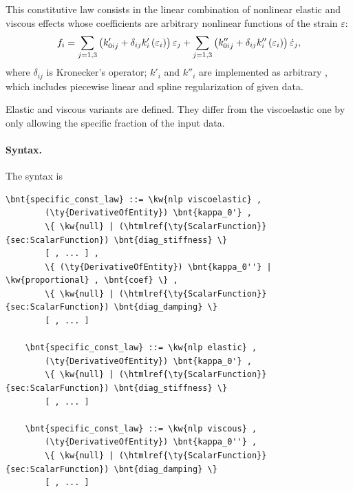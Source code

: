 This constitutive law consists in the linear combination
of nonlinear elastic and viscous effects whose coefficients
are arbitrary nonlinear functions of the strain $\varepsilon$:
\begin{equation}
	f_i = \sum_{j=1,3} \left( 
		k'_{0ij} + \delta_{ij} k_i'\left( \varepsilon_i \right)
	 \right) \varepsilon_j
	+ \sum_{j=1,3} \left( 
		k''_{0ij} + \delta_{ij} k''_i\left( \varepsilon_i \right)
	 \right) \dot{\varepsilon}_j ,
	\label{eq:nlp-cl}
\end{equation}
where $\delta_{ij}$ is Kronecker's operator;
$k'_i$ and $k''_i$ are implemented as arbitrary
,
which includes piecewise linear and spline regularization
of given data.

Elastic and viscous variants are defined.
They differ from the viscoelastic one by only allowing
the specific fraction of the input data.

\paragraph{Syntax.}
The syntax is
\begin{Verbatim}[commandchars=\\\{\}]
    \bnt{specific_const_law} ::= \kw{nlp viscoelastic} ,
        (\ty{DerivativeOfEntity}) \bnt{kappa_0'} ,
        \{ \kw{null} | (\htmlref{\ty{ScalarFunction}}{sec:ScalarFunction}) \bnt{diag_stiffness} \}
        [ , ... ] ,
        \{ (\ty{DerivativeOfEntity}) \bnt{kappa_0''} | \kw{proportional} , \bnt{coef} \} ,
        \{ \kw{null} | (\htmlref{\ty{ScalarFunction}}{sec:ScalarFunction}) \bnt{diag_damping} \}
        [ , ... ]

    \bnt{specific_const_law} ::= \kw{nlp elastic} ,
        (\ty{DerivativeOfEntity}) \bnt{kappa_0'} ,
        \{ \kw{null} | (\htmlref{\ty{ScalarFunction}}{sec:ScalarFunction}) \bnt{diag_stiffness} \}
        [ , ... ]

    \bnt{specific_const_law} ::= \kw{nlp viscous} ,
        (\ty{DerivativeOfEntity}) \bnt{kappa_0''} ,
        \{ \kw{null} | (\htmlref{\ty{ScalarFunction}}{sec:ScalarFunction}) \bnt{diag_damping} \}
        [ , ... ]
\end{Verbatim}

